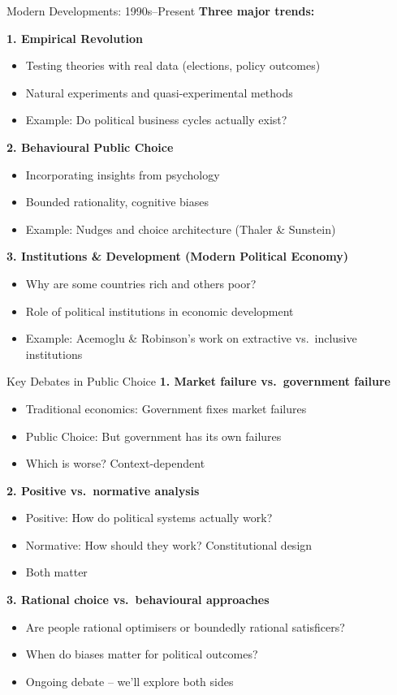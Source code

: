 \documentclass[10pt]{beamer}
\begin{document}
\begin{frame}{Modern Developments: 1990s--Present}
\textbf{Three major trends:}


\textbf{1. Empirical Revolution}
\begin{itemize}
\item Testing theories with real data (elections, policy outcomes)
\item Natural experiments and quasi-experimental methods
\item Example: Do political business cycles actually exist?
\end{itemize}


\textbf{2. Behavioural Public Choice}
\begin{itemize}
\item Incorporating insights from psychology
\item Bounded rationality, cognitive biases
\item Example: Nudges and choice architecture (Thaler \& Sunstein)
\end{itemize}


\textbf{3. Institutions \& Development (Modern Political Economy)}
\begin{itemize}
\item Why are some countries rich and others poor?
\item Role of political institutions in economic development
\item Example: Acemoglu \& Robinson's work on extractive vs.\ inclusive institutions
\end{itemize}
\end{frame}

\begin{frame}{Key Debates in Public Choice}
\textbf{1. Market failure vs.\ government failure}
\begin{itemize}
\item Traditional economics: Government fixes market failures
\item Public Choice: But government has its own failures
\item Which is worse? Context-dependent
\end{itemize}


\textbf{2. Positive vs.\ normative analysis}
\begin{itemize}
\item Positive: How do political systems actually work?
\item Normative: How should they work? Constitutional design
\item Both matter
\end{itemize}


\textbf{3. Rational choice vs.\ behavioural approaches}
\begin{itemize}
\item Are people rational optimisers or boundedly rational satisficers?
\item When do biases matter for political outcomes?
\item Ongoing debate -- we'll explore both sides
\end{itemize}
\end{frame}
\end{document}
